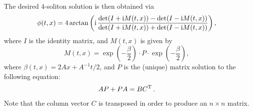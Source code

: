 \documentclass[11pt]{book}
\def\ii{{\rm i}}
\begin{document}
The desired $4$-soliton solution is then obtained via
\begin{equation}
  \phi(t,x) = 4\arctan \left(\ii\,\frac{\det(I + \ii M(t,x))-\det(I - \ii M(t,x))}{\det(I + \ii M(t,x))+\det(I - \ii M(t,x))}\right),
\end{equation}
where $I$ is the identity matrix, and $M(t,x)$ is given by
\begin{equation}
  M(t,x) = \exp\left(-\frac{\beta}{2}\right)\cdot P \cdot \exp\left(-\frac{\beta}{2}\right),
\end{equation}
where $\beta(t,x) = 2Ax+A^{-1}t/2$, and $P$ is the (unique) matrix solution to the following equation:
\begin{equation}\label{lyapnov}
  AP + PA = B C^{\rm T}\,.
\end{equation}
Note that the column vector $C$ is transposed in order to produce an $n\times n$ matrix.

\medbreak
\end{document}
